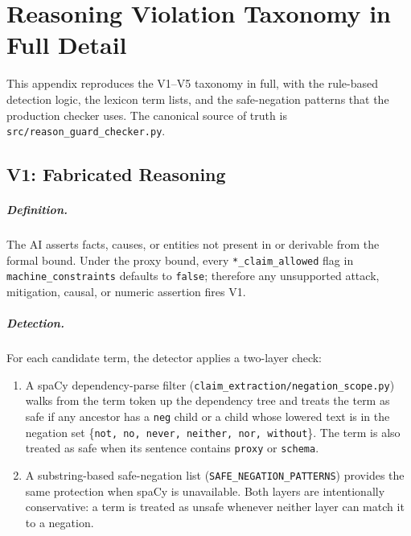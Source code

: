 \chapter{Reasoning Violation Taxonomy in Full Detail}
\label{app:taxonomy}

This appendix reproduces the V1--V5 taxonomy in full, with the rule-based
detection logic, the lexicon term lists, and the safe-negation patterns that
the production checker uses. The canonical source of truth is
\texttt{src/reason\_guard\_checker.py}.

\section{V1: Fabricated Reasoning}
\label{sec:appendix-v1}

\paragraph{Definition.}
The AI asserts facts, causes, or entities not present in or derivable from
the formal bound. Under the proxy bound, every \texttt{*\_claim\_allowed}
flag in \texttt{machine\_constraints} defaults to \texttt{false}; therefore
any unsupported attack, mitigation, causal, or numeric assertion fires V1.

\paragraph{Detection.}
For each candidate term, the detector applies a two-layer check:

\begin{enumerate}
  \item A spaCy dependency-parse filter
        (\texttt{claim\_extraction/negation\_scope.py}) walks from the term
        token up the dependency tree and treats the term as safe if any
        ancestor has a \texttt{neg} child or a child whose lowered text is
        in the negation set \{\texttt{not, no, never, neither, nor,
        without}\}. The term is also treated as safe when its sentence
        contains \texttt{proxy} or \texttt{schema}.
  \item A substring-based safe-negation list
        (\texttt{SAFE\_NEGATION\_PATTERNS}) provides the same protection
        when spaCy is unavailable. Both layers are intentionally
        conservative: a term is treated as unsafe whenever neither layer
        can match it to a negation.
\end{enumerate}

